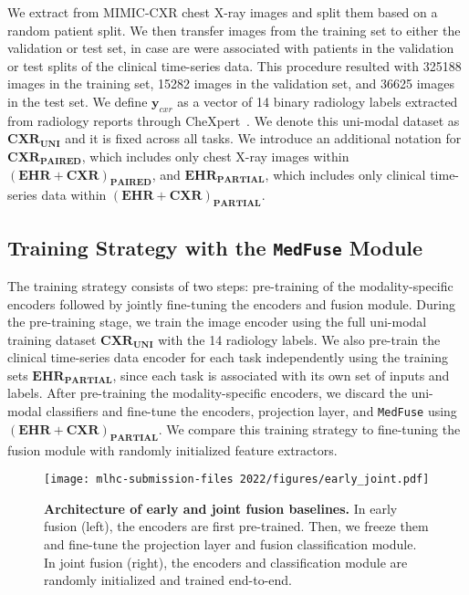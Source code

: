 \documentclass[pmlr]{jmlr}
\begin{document}
We extract from MIMIC-CXR chest X-ray images and split them based on a random patient split. We then transfer images from the training set to either the validation or test set, in case are were associated with patients in the validation or test splits of the clinical time-series data. This procedure resulted with 325188 images in the training set, 15282 images in the validation set, and 36625 images in the test set. We define  $\mathbf{y}_{cxr}$ as a vector of 14 binary radiology labels extracted from radiology reports through CheXpert~\citep{irvin2019chexpert}. We denote this uni-modal dataset as $\mathbf{CXR}_{\mathbf{UNI}}$ and it is fixed across all tasks.  We introduce an additional notation for $\mathbf{CXR}_{\mathbf{PAIRED}}$, which includes only chest X-ray images within $(\mathbf{EHR}+\mathbf{CXR})_\mathbf{PAIRED}$, and $\mathbf{EHR}_{\mathbf{PARTIAL}}$, which includes only clinical time-series data within $(\mathbf{EHR}+\mathbf{CXR})_\mathbf{PARTIAL}$.



\subsection{Training Strategy with the \texttt{MedFuse} Module}
The training strategy consists of two steps: pre-training of the modality-specific encoders followed by jointly fine-tuning the encoders and fusion module. During the pre-training stage, we train the image encoder using the full uni-modal training dataset $\mathbf{CXR}_{\mathbf{UNI}}$ with the 14 radiology labels. We also pre-train the clinical time-series data encoder for each task independently using the training sets $\mathbf{EHR}_{\mathbf{PARTIAL}}$, since each task is associated with its own set of inputs and labels. After pre-training the modality-specific encoders, we discard the uni-modal classifiers and fine-tune the encoders, projection layer, and \texttt{MedFuse} using $(\mathbf{EHR+CXR})_{\mathbf{PARTIAL}}$. We compare this training strategy to fine-tuning the fusion module with randomly initialized feature extractors. 





\begin{figure}
    \centering
    \texttt{[image: mlhc-submission-files 2022/figures/early\_joint.pdf]}
    \caption{\small\textbf{Architecture of early and joint fusion baselines.} In early fusion (left), the encoders are first pre-trained. Then, we freeze them and fine-tune the projection layer and fusion classification module. In joint fusion (right), the encoders and classification module are randomly initialized and trained end-to-end.\vspace{-10mm}}
    \label{fig:baselines}
\end{figure}
\end{document}

